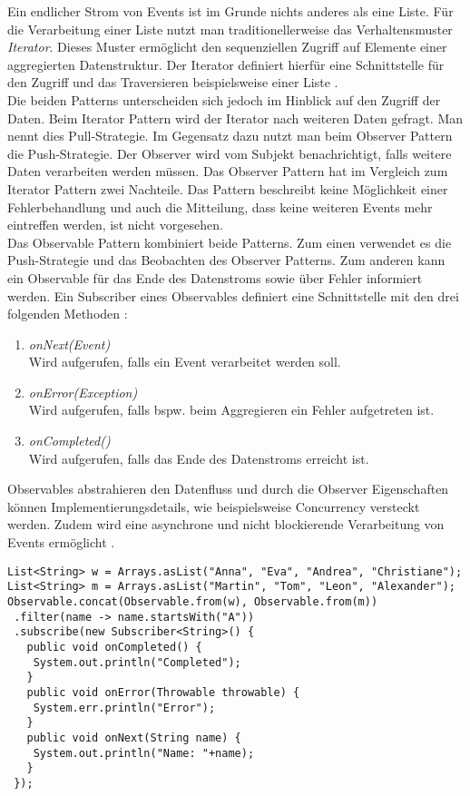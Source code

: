 Ein endlicher Strom von Events ist im Grunde nichts anderes als eine Liste. Für die Verarbeitung einer Liste nutzt man traditionellerweise das Verhaltensmuster \textit{Iterator}. Dieses Muster ermöglicht den sequenziellen Zugriff auf Elemente einer aggregierten Datenstruktur. Der Iterator definiert hierfür eine Schnittstelle für den Zugriff und das Traversieren beispielsweise einer Liste \cite[S.~257]{gamma_design_1995}.\\
Die beiden Patterns unterscheiden sich jedoch im Hinblick auf den Zugriff der Daten. Beim Iterator Pattern wird der Iterator nach weiteren Daten gefragt. Man nennt dies Pull-Strategie. Im Gegensatz dazu nutzt man beim Observer Pattern die Push-Strategie. Der Observer wird vom Subjekt benachrichtigt, falls weitere Daten verarbeiten werden müssen. Das Observer Pattern hat im Vergleich zum Iterator Pattern zwei Nachteile. Das Pattern beschreibt keine Möglichkeit einer Fehlerbehandlung und auch die Mitteilung, dass keine weiteren Events mehr eintreffen werden, ist nicht vorgesehen.\\
Das Observable Pattern kombiniert beide Patterns. Zum einen verwendet es die Push-Strategie und das Beobachten des Observer Patterns. Zum anderen kann ein Observable für das Ende des Datenstroms sowie über Fehler informiert werden. Ein Subscriber eines Observables definiert eine Schnittstelle mit den drei folgenden Methoden \cite{reactivex_2014}:

\begin{enumerate}
\item \textit{onNext(Event)}\\
Wird aufgerufen, falls ein Event verarbeitet werden soll.
\item \textit{onError(Exception)}\\
Wird aufgerufen, falls bspw. beim Aggregieren ein Fehler aufgetreten ist.
\item \textit{onCompleted()}\\
Wird aufgerufen, falls das Ende des Datenstroms erreicht ist.
\end{enumerate}

Observables abstrahieren den Datenfluss und durch die Observer Eigenschaften können Implementierungsdetails, wie beispielsweise Concurrency versteckt werden. Zudem wird eine asynchrone und nicht blockierende Verarbeitung von Events ermöglicht \cite[S.~81]{kuhn_reactive_2015}.

\pagebreak

\begin{lstlisting}[caption={Zusammenknüpfen und filtern zweiter Listen mit RxJava},label={lst:rxjava}]
List<String> w = Arrays.asList("Anna", "Eva", "Andrea", "Christiane");
List<String> m = Arrays.asList("Martin", "Tom", "Leon", "Alexander");
Observable.concat(Observable.from(w), Observable.from(m))
 .filter(name -> name.startsWith("A"))
 .subscribe(new Subscriber<String>() {
   public void onCompleted() {
    System.out.println("Completed");
   }
   public void onError(Throwable throwable) {
    System.err.println("Error");
   }
   public void onNext(String name) {
    System.out.println("Name: "+name);
   }
 });
\end{lstlisting}


